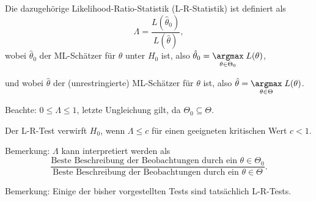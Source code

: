 \documentclass{tstextbook}
\begin{document}
Die dazugehörige Likelihood-Ratio-Statistik (L-R-Statistik)  ist definiert als 
\[
\Lambda = \frac{L(\hat{\theta}_0)}{L(\hat{\theta})}, 
\] wobei $ \hat{\theta}_0 $ der ML-Schätzer für $ \theta $ unter $ H_0 $ ist, also $ \hat{\theta}_0 = \underset{\theta\in\Theta_0}{\argmax} \; L(\theta) $, 

und wobei $ \hat{\theta} $ der (unrestringierte) ML-Schätzer für $ \theta $ ist, also $ \hat{\theta} = \underset{\theta\in\Theta}{\argmax} \; L(\theta) $.

\begin{remark}
Beachte: $ 0\le\Lambda\le 1 $, letzte Ungleichung gilt, da $ \Theta_0\subseteq\Theta $.
\end{remark}

Der L-R-Test verwirft $ H_0 $, wenn $ \Lambda\le c $ für einen geeigneten kritischen Wert $ c<1 $.

\begin{remark}
	Bemerkung: $ \Lambda $ kann interpretiert werden als 
	\[
	\frac{\text{Beste Beschreibung der Beobachtungen durch ein }\theta\in\Theta_0}{\text{Beste Beschreibung der Beobachtungen durch ein }\theta\in\Theta}.
	\]
\end{remark}

\begin{remark}
	Bemerkung: Einige der bisher vorgestellten Tests sind tatsächlich L-R-Tests.
\end{remark}
\end{document}
